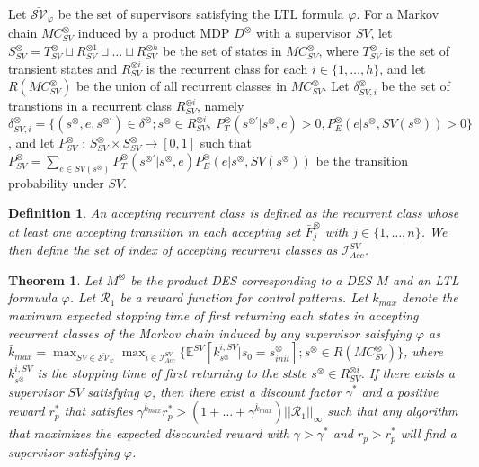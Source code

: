 \documentclass[10pt]{article}
\newtheorem{theorem}{Theorem}
\newtheorem{definition}{Definition}
\begin{document}
Let $\bar{\mathcal{SV}}_{\varphi}$ be the set of supervisors satisfying the LTL formula $\varphi$.
For a Markov chain $MC^{\otimes}_{SV}$ induced by a product MDP $D^{\otimes}$ with a supervisor $SV$, let $S^{\otimes}_{SV}= T^{\otimes}_{SV} \sqcup R^{\otimes 1}_{SV} \sqcup \ldots \sqcup R^{\otimes h}_{SV}$ be the set of states in $MC^{\otimes}_{SV}$, where $T^{\otimes}_{SV}$ is the set of transient states and $R^{\otimes i}_{SV}$ is the recurrent class for each $i \in \{ 1, \ldots ,h \}$, and let $R(MC^{\otimes}_{SV})$ be the union of all recurrent classes in $MC^{\otimes}_{SV}$. Let $\delta^{\otimes}_{SV,i}$ be the set of transtions in a recurrent class $R^{\otimes i}_{SV}$, namely $\delta^{\otimes}_{SV,i} = \{ (s^{\otimes}, e, s^{\otimes \prime}) \in \delta^{\otimes} ; s^{\otimes} \in R^{\otimes i}_{SV},\ P^{\otimes}_T(s^{\otimes \prime}|s^{\otimes}, e) > 0, P^{\otimes}_E(e | s^{\otimes}, SV(s^{\otimes})) > 0 \}$, and let $P^{\otimes}_{SV}$ : $S^{\otimes}_{SV} \times S^{\otimes}_{SV} \rightarrow [0,1]$ such that $P^{\otimes}_{SV} = \sum_{e \in SV(s^{\otimes})} P^{\otimes}_T (s^{\otimes \prime} | s^{\otimes}, e) P^{\otimes}_E (e | s^{\otimes}, SV(s^{\otimes}))$ be the transition probability under $SV$.

\begin{definition}
  An accepting recurrent class is defined as the recurrent class whose at least one accepting transition in each accepting set $\bar{F}^{\otimes}_j$ with $j \in \{ 1, \ldots, n \}$. We then define the set of index of accepting recurrent classes as $\mathcal{I}^{SV}_{Acc}$.
\end{definition}

\begin{theorem}
  Let $M^{\otimes}$ be the product DES corresponding to a DES $M$ and an LTL formuula $\varphi$. Let $\mathcal{R}_1$ be a reward function for control patterns. Let $\bar{k}_{max}$ denote the maximum expected stopping time of first returning each states in accepting recurrent classes of the Markov chain induced by any supervisor saisfying $\varphi$ as $\bar{k}_{max} = \max_{SV \in \bar{\mathcal{SV}}_{\varphi}} \max_{i \in \mathcal{I}^{SV}_{Acc}} \{ \mathbb{E}^{SV}[k^{i,SV}_{s^{\otimes}} | s_0 = s^{\otimes}_{init}] ; s^{\otimes} \in R(MC^{\otimes}_{SV}) \}$, where $ k^{i,SV}_{s^{\otimes}} $ is the stopping time of first returning to the stste $s^{\otimes} \in R^{\otimes i}_{SV}$. If there exists a supervisor $SV$ satisfying $\varphi$, then there exist a discount factor $\gamma^{\ast}$ and a positive reward $r^{\ast}_p$ that satisfies $\gamma^{\bar{k}_{max}} r^{\ast}_p > (1 + \ldots + \gamma^{\bar{k}_{max}} ) ||\mathcal{R}_1||_{\infty}$
   such that any algorithm that maximizes the expected discounted reward with $\gamma > \gamma^{\ast}$ and $r_p > r^{\ast}_p$ will find a supervisor satisfying $\varphi$.
\end{theorem}
\end{document}
